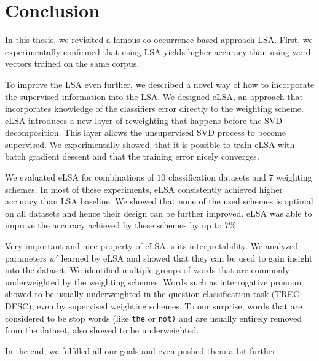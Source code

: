 \chapter*{Conclusion}
\* %

In this thesis, we revisited a famous co-occurrence-based approach LSA.
First, we experimentally confirmed that using LSA yields higher accuracy than using
word vectors trained on the same corpus.

To improve the LSA even further, we described a novel way of how to incorporate the supervised information into the LSA.
We designed eLSA, an approach that incorporates knowledge of the classifiers error directly to the weighting scheme.
eLSA introduces a new layer of reweighting that happens before the SVD decomposition.
This layer allows the unsupervised SVD process to become supervised.
We experimentally showed, that it is possible to train eLSA with batch gradient descent and that the training error nicely converges.

We evaluated eLSA for combinations of $10$  classification datasets and $7$ weighting schemes.
In most of these experiments, eLSA consistently achieved higher accuracy than LSA baseline.
We showed that none of the used schemes is optimal on all datasets and hence their design can be further improved.
eLSA was able to improve the accuracy achieved by these schemes by up to $7\%$.

Very important and nice property of eLSA is its interpretability.
We analyzed parameters $w'$ learned by eLSA and showed that they can be used to gain insight into the dataset.
We identified multiple groups of words that are commonly underweighted by the weighting schemes.
Words such as interrogative pronoun showed to be usually underweighted in the question classification task (TREC-DESC), even by supervised weighting schemes. 
To our surprise, words that are considered to be stop words (like \texttt{the} or \texttt{not)} and are usually entirely removed from the dataset, also showed to be underweighted. 

In the end, we fulfilled all our goals and even pushed them a bit further.

